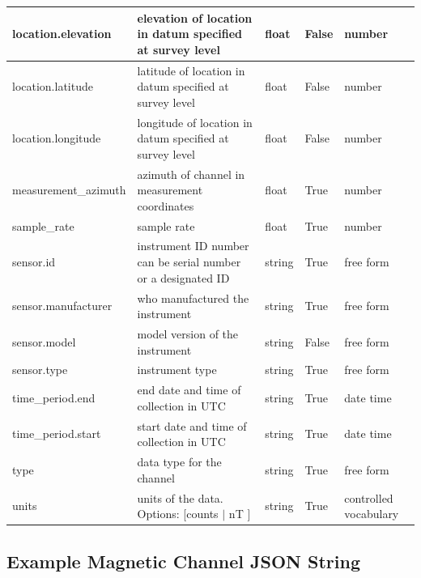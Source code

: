 \documentclass{article}
\begin{document}
\begin{table}[h!]
\begin{tabular}{|l|p{2.75in}|l|l|p{.95in}|}
	location.elevation & elevation of location in datum specified at survey level & float & False & number  \\ \hline
	location.latitude & latitude of location in datum specified at survey level & float & False & number  \\ \hline
	location.longitude & longitude of location in datum specified at survey level & float & False & number  \\ \hline
	measurement\_azimuth & azimuth of channel in measurement coordinates & float & True & number  \\ \hline
	sample\_rate & sample rate & float & True & number  \\ \hline
	sensor.id & instrument ID number can be serial number or a designated ID & string & True & free form  \\ \hline
	sensor.manufacturer & who manufactured the instrument & string & True & free form  \\ \hline
	sensor.model & model version of the instrument & string & False & free form  \\ \hline
	sensor.type & instrument type & string & True & free form  \\ \hline
	time\_period.end & end date and time of collection in UTC & string & True & date time  \\ \hline
	time\_period.start & start date and time of collection in UTC & string & True & date time  \\ \hline
	type & data type for the channel & string & True & free form  \\ \hline
	units & units of the data. Options: [counts $|$ nT ] & string & True & controlled vocabulary  \\ \hline
        \end{tabular}
    \label{tab:magnetic}
\end{table}

\newpage
\subsection{Example Magnetic Channel JSON String}
\end{document}
